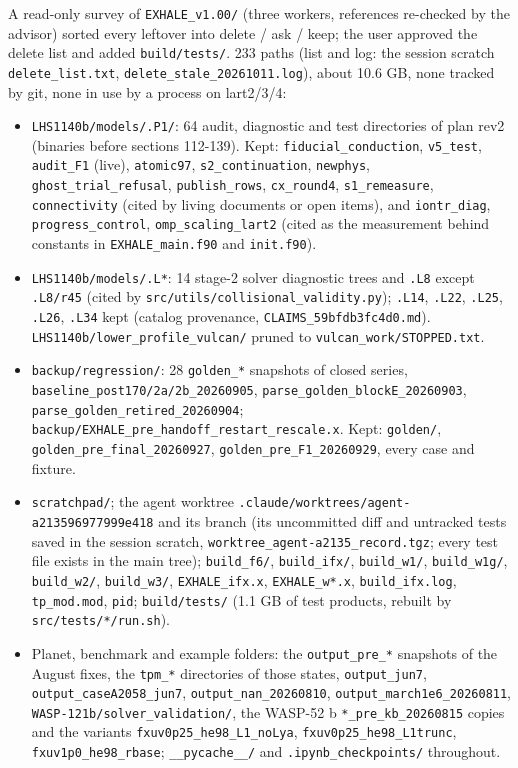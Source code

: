 \documentclass[english,a4paper]{my_memo}
\providecommand{\tightlist}{\setlength{\itemsep}{0pt}\setlength{\parskip}{0pt}}
\begin{document}
A read-only survey of \texttt{EXHALE\_v1.00/} (three workers, references re-checked by the advisor) sorted every leftover into delete / ask / keep; the user approved the delete list and added \texttt{build/tests/}. 233 paths (list and log: the session scratch \texttt{delete\_list.txt}, \texttt{delete\_stale\_20261011.log}), about 10.6 GB, none tracked by git, none in use by a process on lart2/3/4:

\begin{itemize}
\tightlist
\item
  \texttt{LHS1140b/models/.P1/}: 64 audit, diagnostic and test directories of plan rev2 (binaries before sections 112-139). Kept: \texttt{fiducial\_conduction}, \texttt{v5\_test}, \texttt{audit\_F1} (live), \texttt{atomic97}, \texttt{s2\_continuation}, \texttt{newphys}, \texttt{ghost\_trial\_refusal}, \texttt{publish\_rows}, \texttt{cx\_round4}, \texttt{s1\_remeasure}, \texttt{connectivity} (cited by living documents or open items), and \texttt{iontr\_diag}, \texttt{progress\_control}, \texttt{omp\_scaling\_lart2} (cited as the measurement behind constants in \texttt{EXHALE\_main.f90} and \texttt{init.f90}).
\item
  \texttt{LHS1140b/models/.L*}: 14 stage-2 solver diagnostic trees and \texttt{.L8} except \texttt{.L8/r45} (cited by \texttt{src/utils/collisional\_validity.py}); \texttt{.L14}, \texttt{.L22}, \texttt{.L25}, \texttt{.L26}, \texttt{.L34} kept (catalog provenance, \texttt{CLAIMS\_59bfdb3fc4d0.md}). \texttt{LHS1140b/lower\_profile\_vulcan/} pruned to \texttt{vulcan\_work/STOPPED.txt}.
\item
  \texttt{backup/regression/}: 28 \texttt{golden\_*} snapshots of closed series, \texttt{baseline\_post170/2a/2b\_20260905}, \texttt{parse\_golden\_blockE\_20260903}, \texttt{parse\_golden\_retired\_20260904}; \texttt{backup/EXHALE\_pre\_handoff\_restart\_rescale.x}. Kept: \texttt{golden/}, \texttt{golden\_pre\_final\_20260927}, \texttt{golden\_pre\_F1\_20260929}, every case and fixture.
\item
  \texttt{scratchpad/}; the agent worktree \texttt{.claude/worktrees/agent-a213596977999e418} and its branch (its uncommitted diff and untracked tests saved in the session scratch, \texttt{worktree\_agent-a2135\_record.tgz}; every test file exists in the main tree); \texttt{build\_f6/}, \texttt{build\_ifx/}, \texttt{build\_w1/}, \texttt{build\_w1g/}, \texttt{build\_w2/}, \texttt{build\_w3/}, \texttt{EXHALE\_ifx.x}, \texttt{EXHALE\_w*.x}, \texttt{build\_ifx.log}, \texttt{tp\_mod.mod}, \texttt{pid}; \texttt{build/tests/} (1.1 GB of test products, rebuilt by \texttt{src/tests/*/run.sh}).
\item
  Planet, benchmark and example folders: the \texttt{output\_pre\_*} snapshots of the August fixes, the \texttt{tpm\_*} directories of those states, \texttt{output\_jun7}, \texttt{output\_caseA2058\_jun7}, \texttt{output\_nan\_20260810}, \texttt{output\_march1e6\_20260811}, \texttt{WASP-121b/solver\_validation/}, the WASP-52 b \texttt{*\_pre\_kb\_20260815} copies and the variants \texttt{fxuv0p25\_he98\_L1\_noLya}, \texttt{fxuv0p25\_he98\_L1trunc}, \texttt{fxuv1p0\_he98\_rbase}; \texttt{\_\_pycache\_\_/} and \texttt{.ipynb\_checkpoints/} throughout.
\end{itemize}
\end{document}
